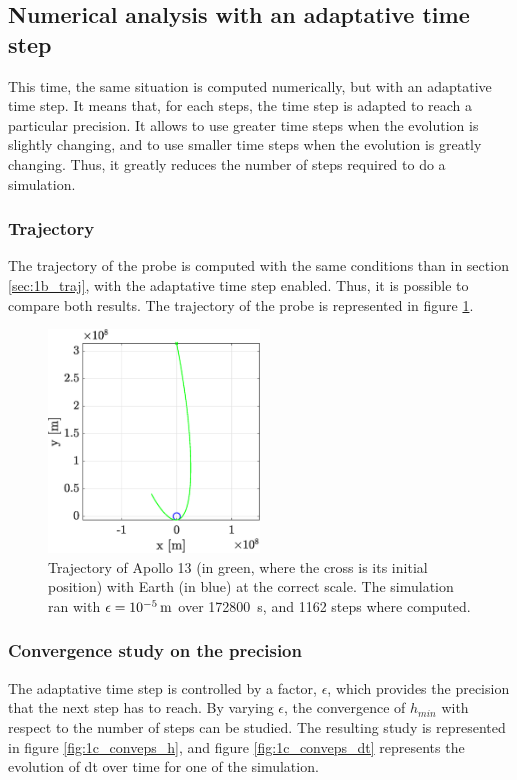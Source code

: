 \documentclass[a4paper,12pt,twoside]{article}
\begin{document}

\subsection{Numerical analysis with an adaptative time step}
This time, the same situation is computed numerically, but with an adaptative time step.
It means that, for each steps, the time step is adapted to reach a particular precision.
It allows to use greater time steps when the evolution is slightly changing, and to use smaller time steps when the evolution is greatly changing.
Thus, it greatly reduces the number of steps required to do a simulation.

\subsubsection{Trajectory}
The trajectory of the probe is computed with the same conditions than in section \ref{sec:1b_traj}, with the adaptative time step enabled.
Thus, it is possible to compare both results.
The trajectory of the probe is represented in figure \ref{fig:1c_traj}.

\begin{figure}
  \centering
  \includegraphics[width=0.5\textwidth]{graphs/ex1c_traj.eps}
  \caption{Trajectory of Apollo 13 (in green, where the cross is its initial position) with Earth (in blue) at the correct scale. The simulation ran with $\epsilon=\SI{d-5}{\m}$ over \SI{172800}{\s}, and \num{1162} steps where computed.}
  \label{fig:1c_traj}
\end{figure}



\subsubsection{Convergence study on the precision}
The adaptative time step is controlled by a factor, $\epsilon$, which provides the precision that the next step has to reach.
By varying $\epsilon$, the convergence of $h_{min}$ with respect to the number of steps can be studied.
The resulting study is represented in figure \ref{fig:1c_conveps_h}, and figure \ref{fig:1c_conveps_dt} represents the evolution of dt over time for one of the simulation.
\end{document}
